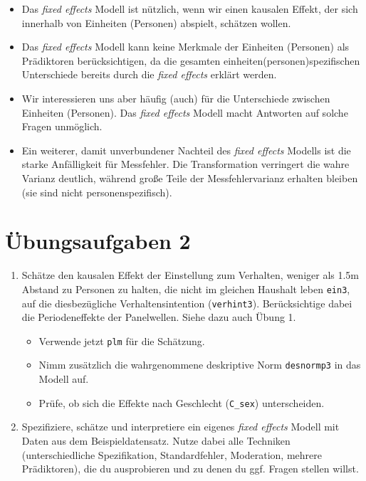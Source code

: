 \documentclass[
]{book}
\providecommand{\tightlist}{%
  \setlength{\itemsep}{0pt}\setlength{\parskip}{0pt}}
\begin{document}
\begin{itemize}
\item
  Das \emph{fixed effects} Modell ist nützlich, wenn wir einen kausalen Effekt, der sich innerhalb von Einheiten (Personen) abspielt, schätzen wollen.
\item
  Das \emph{fixed effects} Modell kann keine Merkmale der Einheiten (Personen) als Prädiktoren berücksichtigen, da die gesamten einheiten(personen)spezifischen Unterschiede bereits durch die \emph{fixed effects} erklärt werden.
\item
  Wir interessieren uns aber häufig (auch) für die Unterschiede zwischen Einheiten (Personen). Das \emph{fixed effects} Modell macht Antworten auf solche Fragen unmöglich.
\item
  Ein weiterer, damit unverbundener Nachteil des \emph{fixed effects} Modells ist die starke Anfälligkeit für Messfehler. Die Transformation verringert die wahre Varianz deutlich, während große Teile der Messfehlervarianz erhalten bleiben (sie sind nicht personenspezifisch).
\end{itemize}

\hypertarget{uxfcbungsaufgaben-2}{%
\section{Übungsaufgaben 2}\label{uxfcbungsaufgaben-2}}

\begin{enumerate}
\def\labelenumi{\arabic{enumi})}
\tightlist
\item
  Schätze den kausalen Effekt der Einstellung zum Verhalten, weniger als 1.5m Abstand zu Personen zu halten, die nicht im gleichen Haushalt leben \texttt{ein3}, auf die diesbezügliche Verhaltensintention (\texttt{verhint3}). Berücksichtige dabei die Periodeneffekte der Panelwellen. Siehe dazu auch Übung 1.

  \begin{itemize}
  \tightlist
  \item
    Verwende jetzt \texttt{plm} für die Schätzung.
  \item
    Nimm zusätzlich die wahrgenommene deskriptive Norm \texttt{desnormp3} in das Modell auf.
  \item
    Prüfe, ob sich die Effekte nach Geschlecht (\texttt{C\_sex}) unterscheiden.
  \end{itemize}
\item
  Spezifiziere, schätze und interpretiere ein eigenes \emph{fixed effects} Modell mit Daten aus dem Beispieldatensatz. Nutze dabei alle Techniken (unterschiedliche Spezifikation, Standardfehler, Moderation, mehrere Prädiktoren), die du ausprobieren und zu denen du ggf. Fragen stellen willst.
\end{enumerate}
\end{document}
